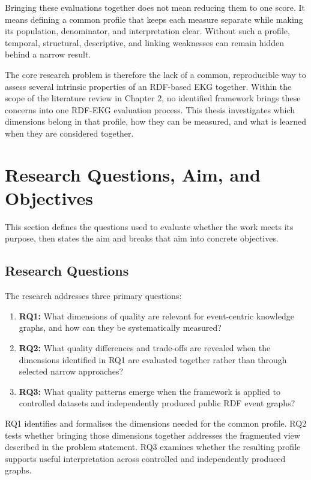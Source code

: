Bringing these evaluations together does not mean reducing them to one score. It means defining a common profile that keeps each measure separate while making its population, denominator, and interpretation clear. Without such a profile, temporal, structural, descriptive, and linking weaknesses can remain hidden behind a narrow result.

The core research problem is therefore the lack of a common, reproducible way to assess several intrinsic properties of an RDF-based EKG together. Within the scope of the literature review in Chapter 2, no identified framework brings these concerns into one RDF-EKG evaluation process. This thesis investigates which dimensions belong in that profile, how they can be measured, and what is learned when they are considered together.

\section{Research Questions, Aim, and Objectives}

This section defines the questions used to evaluate whether the work meets its purpose, then states the aim and breaks that aim into concrete objectives.

\subsection{Research Questions}

The research addresses three primary questions:

\begin{enumerate}
    \item \textbf{RQ1:} What dimensions of quality are relevant for event-centric knowledge graphs, and how can they be systematically measured?
    \item \textbf{RQ2:} What quality differences and trade-offs are revealed when the dimensions identified in RQ1 are evaluated together rather than through selected narrow approaches?
    \item \textbf{RQ3:} What quality patterns emerge when the framework is applied to controlled datasets and independently produced public RDF event graphs?
\end{enumerate}

RQ1 identifies and formalises the dimensions needed for the common profile. RQ2 tests whether bringing those dimensions together addresses the fragmented view described in the problem statement. RQ3 examines whether the resulting profile supports useful interpretation across controlled and independently produced graphs.

